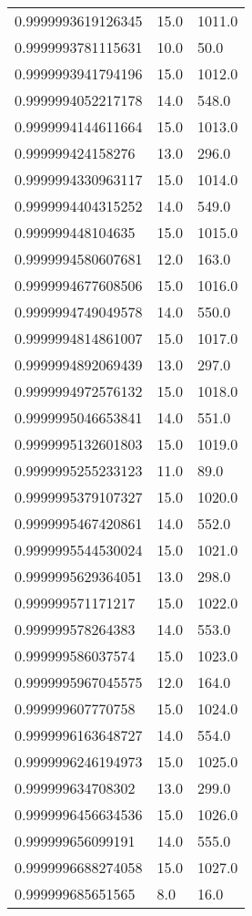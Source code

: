 \begin{center}
\begin{supertabular}[H]{p{0.30\textwidth}p{0.05\textwidth}p{0.05\textwidth}}
0.9999993619126345 & 15.0 & 1011.0 \\ 
0.9999993781115631 & 10.0 & 50.0 \\ 
0.9999993941794196 & 15.0 & 1012.0 \\ 
0.9999994052217178 & 14.0 & 548.0 \\ 
0.9999994144611664 & 15.0 & 1013.0 \\ 
0.999999424158276 & 13.0 & 296.0 \\ 
0.9999994330963117 & 15.0 & 1014.0 \\ 
0.9999994404315252 & 14.0 & 549.0 \\ 
0.999999448104635 & 15.0 & 1015.0 \\ 
0.9999994580607681 & 12.0 & 163.0 \\ 
0.9999994677608506 & 15.0 & 1016.0 \\ 
0.9999994749049578 & 14.0 & 550.0 \\ 
0.9999994814861007 & 15.0 & 1017.0 \\ 
0.9999994892069439 & 13.0 & 297.0 \\ 
0.9999994972576132 & 15.0 & 1018.0 \\ 
0.9999995046653841 & 14.0 & 551.0 \\ 
0.9999995132601803 & 15.0 & 1019.0 \\ 
0.9999995255233123 & 11.0 & 89.0 \\ 
0.9999995379107327 & 15.0 & 1020.0 \\ 
0.9999995467420861 & 14.0 & 552.0 \\ 
0.9999995544530024 & 15.0 & 1021.0 \\ 
0.9999995629364051 & 13.0 & 298.0 \\ 
0.999999571171217 & 15.0 & 1022.0 \\ 
0.999999578264383 & 14.0 & 553.0 \\ 
0.999999586037574 & 15.0 & 1023.0 \\ 
0.9999995967045575 & 12.0 & 164.0 \\ 
0.999999607770758 & 15.0 & 1024.0 \\ 
0.9999996163648727 & 14.0 & 554.0 \\ 
0.9999996246194973 & 15.0 & 1025.0 \\ 
0.999999634708302 & 13.0 & 299.0 \\ 
0.9999996456634536 & 15.0 & 1026.0 \\ 
0.999999656099191 & 14.0 & 555.0 \\ 
0.9999996688274058 & 15.0 & 1027.0 \\ 
0.999999685651565 & 8.0 & 16.0 \\ 

\end{supertabular}
\end{center}
